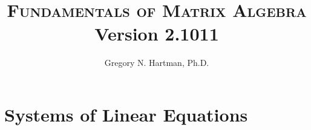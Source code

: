 \documentclass[10pt]{book}
\begin{document}


\printincolor


\drawexamplelines

\printallanswers


\normalem

\sffamily





\clearpage
\thispagestyle{empty}
\frontmatter

\title{\textsc{Fundamentals of Matrix Algebra}\\
{\small Version 2.1011}}
\author{Gregory N. Hartman, Ph.D.}
\date{}



\thispagestyle{empty}
\clearpage


\thispagestyle{empty}


\cleardoublepage
{}

\clearpage{\pagestyle{empty}\cleardoublepage}

\clearpage{\pagestyle{empty}\cleardoublepage}

\tableofcontents
\clearpage{\pagestyle{empty}\cleardoublepage}

\mainmatter







\chapter{Systems of Linear Equations}\label{chapter:linear}
\thispagestyle{empty}






\end{document}
